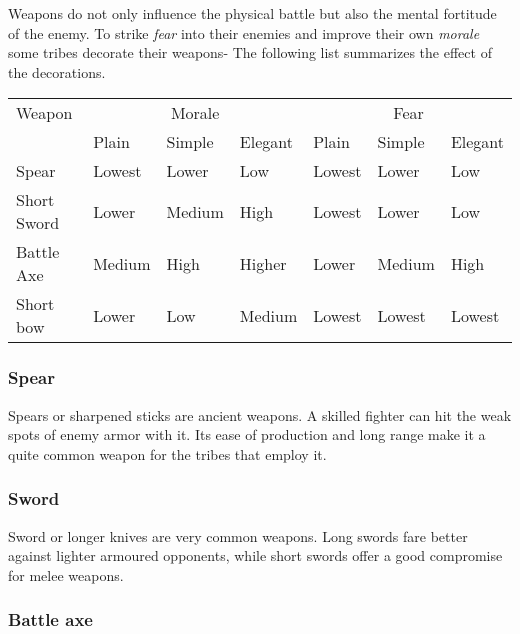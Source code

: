 Weapons do not only influence the physical battle but also the mental fortitude
of the enemy. To strike \emph{fear} into their enemies and improve their own
\emph{morale} some tribes decorate their weapons- The following list summarizes
the effect of the decorations.

\begin{longtable}{l ll ll ll}
	\toprule
	Weapon
	 & \multicolumn{3}{c}{Morale}
	 & \multicolumn{3}{c}{Fear}
	\\
	 & Plain                      & Simple & Elegant
	 & Plain                      & Simple & Elegant \\
	\midrule
	Spear
	 & Lowest                     & Lower  & Low
	 & Lowest                     & Lower  & Low     \\
	Short Sword
	 & Lower                      & Medium & High
	 & Lowest                     & Lower  & Low     \\
	Battle Axe
	 & Medium                     & High   & Higher
	 & Lower                      & Medium & High    \\
	Short bow
	 & Lower                      & Low    & Medium
	 & Lowest                     & Lowest & Lowest  \\
	\bottomrule
\end{longtable}

\subsubsection{Spear}\label{ch:Goods:Armory:Weapons:Spear}

Spears or sharpened sticks are ancient weapons. A skilled fighter can hit the
weak spots of enemy armor with it. Its ease of production and long range make
it a quite common weapon for the tribes that employ it.

\subsubsection{Sword}\label{ch:Goods:Armory:Weapons:Sword}

Sword or longer knives are very common weapons. Long swords fare better against
lighter armoured opponents, while short swords offer a good compromise for
melee weapons.

\subsubsection{Battle axe}\label{ch:Goods:Armory:Weapons:BattleAxe}

